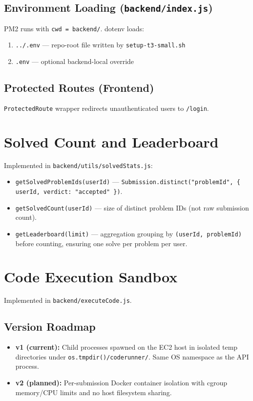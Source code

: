 \documentclass[11pt,a4paper]{article}
\begin{document}
\subsection{Environment Loading (\texttt{backend/index.js})}
PM2 runs with \texttt{cwd = backend/}. dotenv loads:
\begin{enumerate}[noitemsep]
  \item \texttt{../.env} --- repo-root file written by \texttt{setup-t3-small.sh}
  \item \texttt{.env} --- optional backend-local override
\end{enumerate}

\subsection{Protected Routes (Frontend)}
\texttt{ProtectedRoute} wrapper redirects unauthenticated users to \texttt{/login}.

\section{Solved Count and Leaderboard}

Implemented in \texttt{backend/utils/solvedStats.js}:
\begin{itemize}[noitemsep]
  \item \texttt{getSolvedProblemIds(userId)} --- \texttt{Submission.distinct("problemId", \{ userId, verdict: "accepted" \})}.
  \item \texttt{getSolvedCount(userId)} --- size of distinct problem IDs (not raw submission count).
  \item \texttt{getLeaderboard(limit)} --- aggregation grouping by \texttt{(userId, problemId)} before counting, ensuring one solve per problem per user.
\end{itemize}

\section{Code Execution Sandbox}

Implemented in \texttt{backend/executeCode.js}.

\subsection{Version Roadmap}
\begin{itemize}[noitemsep]
  \item \textbf{v1 (current):} Child processes spawned on the EC2 host in isolated temp directories under \texttt{os.tmpdir()/coderunner/}. Same OS namespace as the API process.
  \item \textbf{v2 (planned):} Per-submission Docker container isolation with cgroup memory/CPU limits and no host filesystem sharing.
\end{itemize}
\end{document}
